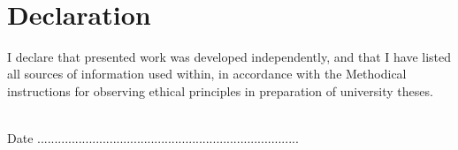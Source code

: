 ~\vfill{}

\section*{Declaration}

I declare that presented work was developed independently, and that I have listed all sources of information used within, in accordance with the Methodical instructions for observing ethical principles in preparation of university theses.

\vspace{1.5cm}
~\\

Date .............................\hfill{}...............................................

\hfill{}~~~~~~~~~~~~~~~

\newpage{}
